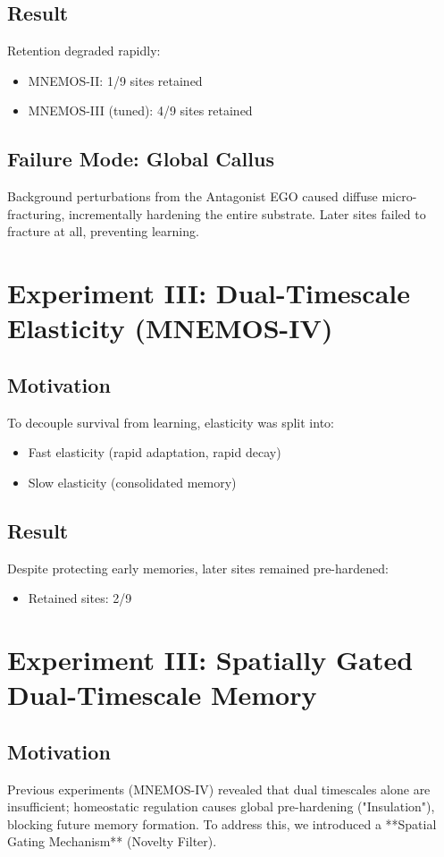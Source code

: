\documentclass[11pt, a4paper]{article}
\begin{document}
\subsection{Result}
Retention degraded rapidly:
\begin{itemize}
    \item MNEMOS-II: 1/9 sites retained
    \item MNEMOS-III (tuned): 4/9 sites retained
\end{itemize}

\subsection{Failure Mode: Global Callus}
Background perturbations from the Antagonist EGO caused diffuse micro-fracturing, incrementally hardening the entire substrate. Later sites failed to fracture at all, preventing learning.

\section{Experiment III: Dual-Timescale Elasticity (MNEMOS-IV)}

\subsection{Motivation}
To decouple survival from learning, elasticity was split into:
\begin{itemize}
    \item Fast elasticity (rapid adaptation, rapid decay)
    \item Slow elasticity (consolidated memory)
\end{itemize}

\subsection{Result}
Despite protecting early memories, later sites remained pre-hardened:
\begin{itemize}
    \item Retained sites: 2/9
\end{itemize}

\section{Experiment III: Spatially Gated Dual-Timescale Memory}

\subsection{Motivation}
Previous experiments (MNEMOS-IV) revealed that dual timescales alone are insufficient; homeostatic regulation causes global pre-hardening ("Insulation"), blocking future memory formation. To address this, we introduced a **Spatial Gating Mechanism** (Novelty Filter).
\end{document}

